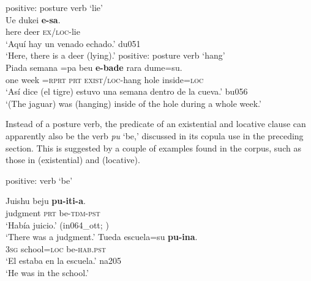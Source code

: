 \documentclass[output=paper,draft,draftmode,colorlinks,citecolor=brown]{langscibook}
\begin{document}
\begin{exe}
\newpage
\ex\label{ex:tacana-posture-lie}  positive: posture verb `lie'\\
\gll
    Ue dukei \textbf{e-sa}.\\
    here  deer  \textsc{ex/loc}-lie\\
\glt `Aquí hay un venado echado.' du051\\
`Here, there is a deer (lying).'
\ex\label{ex:tacana-posture-hang}  positive: posture verb `hang'\\
\gll
 {\ob}Piada semana{\cb} =pa beu \textbf{e-bade}
 rara dume=su{\cb}.\\
 one  week  =\textsc{rprt}  \textsc{prt}  \textsc{exist/loc}-hang  hole
 inside\textsc{=loc}\\
\glt `Así dice (el tigre) estuvo una semana dentro de la cueva.' bu056\\
`(The jaguar) was (hanging) inside of the hole during a whole week.'
\end{exe}

Instead of a posture verb, the predicate of an existential and locative
clause can apparently also be the verb \textit{pu} `be,' discussed in its
copula use in the preceding section. This is suggested by a couple of
examples found in the corpus, such as those in
 (existential) and  (locative). 

\begin{exe}\ex
\label{ex:tacana-be-judgement-school}  positive: verb `be' 
\begin{xlist}
\ex\label{ex:tacana-be-judgement}
\gll {}Juishu  beju \textbf{pu-iti-a}.\\
    judgment  \textsc{prt}  be-\textsc{tdm-pst}\\
\glt `Había juicio.' (in064\_ott; \citealt[62]{Ottaviano1980})\\
`There was a judgment.'
\ex\label{ex:tacana-be-school}
\gll  {}Tueda escuela=su \textbf{pu-ina}.\\
    \textsc{3sg}  school=\textsc{loc}  be-\textsc{hab.pst}\\
\glt `El estaba en la escuela.' na205\\
`He was in the school.'
\end{xlist}\end{exe}
\end{document}
